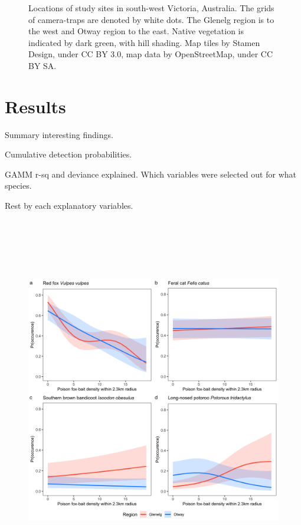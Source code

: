 \documentclass[11pt,a4paper,titlepage,twoside,openright]{style/unimelbthesis}
\begin{document}
\begin{mainmatter}
\begin{figure}
{}

\caption{Locations of study sites in south-west Victoria, Australia. The grids of camera-traps are denoted by white dots. The Glenelg region is to the west and Otway region to the east. Native vegetation is indicated by dark green, with hill shading. Map tiles by Stamen Design, under CC BY 3.0, map data by OpenStreetMap, under CC BY SA.}\label{fig:occ-map}
\end{figure}
\newpage

\hypertarget{results}{%
\section{Results}\label{results}}

Summary interesting findings.

Cumulative detection probabilities.

GAMM r-sq and deviance explained. Which variables were selected out for what species.

Rest by each explanatory variables.

\newpage

\(~\)

\(~\)

\(~\)
\begin{figure}

{\centering \includegraphics[width=1\linewidth]{figure/c1/foxbaits} 

}
\end{figure}
\end{mainmatter}
\end{document}
